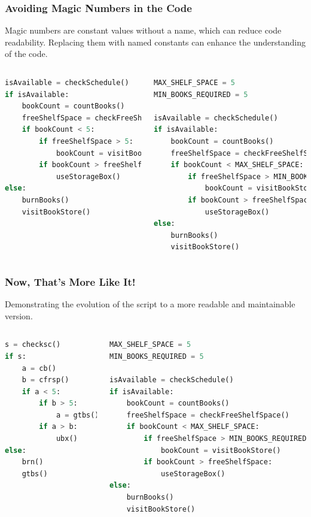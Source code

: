 \begin{frame}[fragile]
 \frametitle{Avoiding Magic Numbers in the Code}
 Magic numbers are constant values without a name, which can reduce code readability. Replacing them with named constants can enhance the understanding of the code.
 \begin{columns}[T]
     \begin{lstlisting}[language=Python,basicstyle=\scriptsize]
isAvailable = checkSchedule()
if isAvailable:
    bookCount = countBooks()
    freeShelfSpace = checkFreeShelfSpace()
    if bookCount < 5:
        if freeShelfSpace > 5:
            bookCount = visitBookStore()
        if bookCount > freeShelfSpace:
            useStorageBox()
else:
    burnBooks()
    visitBookStore()
 \end{lstlisting}
     \begin{lstlisting}[language=Python,basicstyle=\scriptsize,emph={MIN_BOOKS_REQUIRED,MAX_SHELF_SPACE},emphstyle=\color{red}]
MAX_SHELF_SPACE = 5
MIN_BOOKS_REQUIRED = 5

isAvailable = checkSchedule()
if isAvailable:
    bookCount = countBooks()
    freeShelfSpace = checkFreeShelfSpace()
    if bookCount < MAX_SHELF_SPACE:
        if freeShelfSpace > MIN_BOOKS_REQUIRED:
            bookCount = visitBookStore()
        if bookCount > freeShelfSpace:
            useStorageBox()
else:
    burnBooks()
    visitBookStore()
 \end{lstlisting}
 \end{columns}
\end{frame}

\begin{frame}[fragile]
 \frametitle{Now, That's More Like It!}
 Demonstrating the evolution of the script to a more readable and maintainable version.
 \begin{columns}[T]
     \begin{lstlisting}[language=Python]
s = checksc()
if s:
    a = cb()
    b = cfrsp()
    if a < 5:
        if b > 5:
            a = gtbs()
        if a > b:
            ubx()
else:
    brn()
    gtbs()
 \end{lstlisting}
     \begin{lstlisting}[language=Python]
MAX_SHELF_SPACE = 5
MIN_BOOKS_REQUIRED = 5

isAvailable = checkSchedule()
if isAvailable:
    bookCount = countBooks()
    freeShelfSpace = checkFreeShelfSpace()
    if bookCount < MAX_SHELF_SPACE:
        if freeShelfSpace > MIN_BOOKS_REQUIRED:
            bookCount = visitBookStore()
        if bookCount > freeShelfSpace:
            useStorageBox()
else:
    burnBooks()
    visitBookStore()
 \end{lstlisting}
 \end{columns}
\end{frame}


